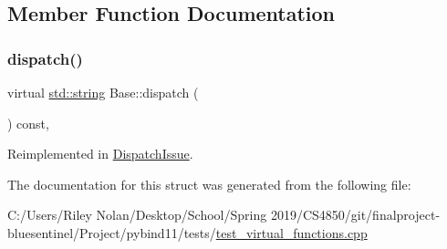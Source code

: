 \subsection{Member Function Documentation}
\mbox{\label{struct_base_a88a122105aa11d0f4e2113beb2a8f669}} 
\subsubsection{\texorpdfstring{dispatch()}{dispatch()}}
{\footnotesize\ttfamily virtual \mbox{\hyperlink{_s_d_l__opengl__glext_8h_ab4ccfaa8ab0e1afaae94dc96ef52dde1}{std\+::string}} Base\+::dispatch (\begin{DoxyParamCaption}{ }\end{DoxyParamCaption}) const\hspace{0.3cm}{\ttfamily [inline]}, {\ttfamily [virtual]}}



Reimplemented in \mbox{\hyperlink{struct_dispatch_issue_ad9b65317bc3660b698ad4b917b8a0b4e}{Dispatch\+Issue}}.



The documentation for this struct was generated from the following file\+:\begin{DoxyCompactItemize}
\item 
C\+:/\+Users/\+Riley Nolan/\+Desktop/\+School/\+Spring 2019/\+C\+S4850/git/finalproject-\/bluesentinel/\+Project/pybind11/tests/\mbox{\hyperlink{test__virtual__functions_8cpp}{test\+\_\+virtual\+\_\+functions.\+cpp}}\end{DoxyCompactItemize}
